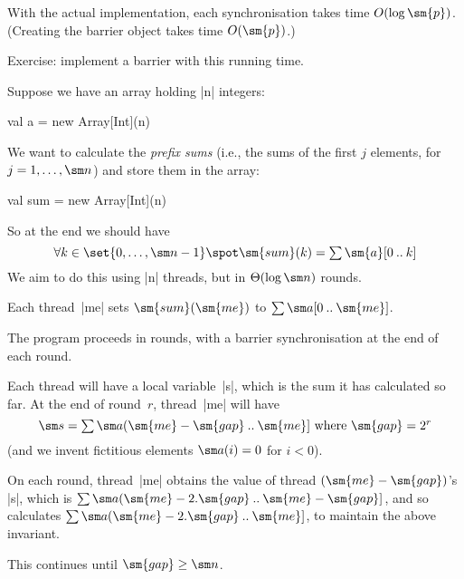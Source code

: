 

\begin{slide}

With the actual implementation, each synchronisation takes time $O(\log
\sm{p})$.  (Creating the barrier object takes time $O(\sm{p})$.)

Exercise: implement a barrier with this running time.
\end{slide}


\begin{slide}

Suppose we have an array holding |n| integers:
\begin{scala}
val a = new Array[Int](n)
\end{scala}
%
We want to calculate the \emph{prefix sums} (i.e., the sums of the first $j$
elements, for $j = 1, \ldots, \sm n$) and store them in the array:
%
\begin{scala}
val sum = new Array[Int](n)
\end{scala}
%
So at the end we should have
\[
\forall k \in \set{0, \ldots, \sm n-1} \spot 
  \sm{sum}(k) = \textstyle\sum \sm{a}[0 \upto k] 
\]
We aim to do this using |n| threads, but in $\Theta(\log \sm n)$ rounds. 
\end{slide}


\begin{slide}

Each thread~|me| sets $\sm{sum}(\sm{me})$ to $\sum \sm a[0 \upto \sm{me}]$.

The program proceeds in rounds, with a barrier synchronisation at the end of
each round.

Each thread will have a local variable~|s|, which is the sum it has
calculated so far.  At the end of round~$r$, thread~|me| will have 
\[
\sm s = \textstyle\sum \sm a(\sm{me}-\sm{gap} \upto \sm{me}]
   \mbox{ where } \sm{gap} = 2^r
\]
(and we invent fictitious elements $\sm a(i)=0$ for $i<0$).

On each round, thread~|me| obtains the value of thread
$(\sm{me}-\sm{gap})$'s |s|, which is
$\sum \sm a(\sm{me}-2.\sm{gap} \upto \sm{me}-\sm{gap}]$, and so calculates
$\sum \sm a(\sm{me}-2.\sm{gap} \upto \sm{me}]$, to maintain the above
invariant.

This continues until $\sm{gap} \ge \sm n$.
\end{slide}


